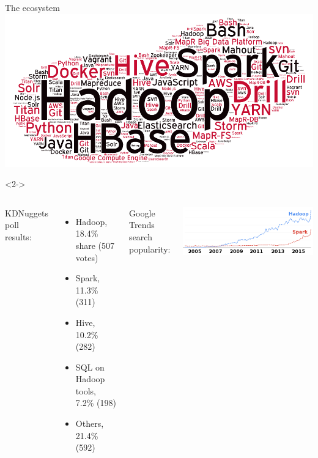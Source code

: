 \documentclass{beamer}
\begin{document}
\vfill
\begin{frame}{The ecosystem}
\vspace{-0.6 cm}
\includegraphics[width=\linewidth]{word-cloud-07-2014.png}

\begin{onlyenv}<2->
\vspace{0.5 cm}
\begin{columns}
KDNuggets poll results:

\vspace{0.1 cm}
{\scriptsize
\begin{itemize}
\item Hadoop, 18.4\% share (507 votes)
\item Spark, 11.3\% (311)
\item Hive, 10.2\% (282)
\item SQL on Hadoop tools, 7.2\% (198)
\item Others, 21.4\% (592)
\end{itemize}}

Google Trends search popularity:

\vspace{0.5 cm}
\includegraphics[width=\linewidth]{trends.png}
\end{columns}
\end{onlyenv}
\end{frame}
\end{document}
